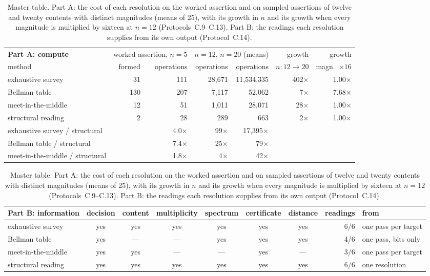 \documentclass[pdflatex,sn-mathphys-num]{sn-jnl}
\theoremstyle{thmstyleone}%
\theoremstyle{thmstyletwo}%
\theoremstyle{thmstylethree}%
\begin{document}
\begin{table}[!htbp]
\centering\footnotesize
\caption{Master table. Part A: the cost of each resolution on the worked assertion and on sampled assertions of twelve and twenty contents with distinct magnitudes (means of 25), with its growth in $n$ and its growth when every magnitude is multiplied by sixteen at $n=12$ (Protocols~C.9--C.13). Part B: the readings each resolution supplies from its own output (Protocol~C.14).}
\label{tab:master}
\setlength{\tabcolsep}{4pt}
\begin{tabular}{lrrrrrr}
\toprule
\textbf{Part A: compute} & \multicolumn{2}{c}{worked assertion, $n=5$} & \multicolumn{2}{c}{$n=12$, $n=20$ (means)} & growth & growth \\
method & formed & operations & operations & operations & $n{:}12\to20$ & magn.\ $\times16$ \\
\midrule
exhaustive survey & 31 & 111 & 28,671 & 11,534,335 & 402$\times$ & 1.00$\times$ \\
Bellman table & 130 & 207 & 7,117 & 52,062 & 7$\times$ & 7.68$\times$ \\
meet-in-the-middle & 12 & 51 & 1,011 & 28,071 & 28$\times$ & 1.00$\times$ \\
structural reading & 2 & 28 & 289 & 663 & 2$\times$ & 1.00$\times$ \\
\midrule
\quad exhaustive survey / structural & & 4.0$\times$ & 99$\times$ & 17,395$\times$ & & \\
\quad Bellman table / structural & & 7.4$\times$ & 25$\times$ & 79$\times$ & & \\
\quad meet-in-the-middle / structural & & 1.8$\times$ & 4$\times$ & 42$\times$ & & \\
\bottomrule
\end{tabular}\par\vspace{0.8em}
\begin{tabular}{lccccccrl}
\toprule
\textbf{Part B: information} & decision & content & multiplicity & spectrum & certificate & distance & readings & from \\
\midrule
exhaustive survey & yes & yes & yes & yes & yes & yes & 6/6 & one pass per target \\
Bellman table & yes & --- & --- & yes & yes & yes & 4/6 & one pass, bits only \\
meet-in-the-middle & yes & yes & --- & --- & yes & --- & 3/6 & one pass per target \\
structural reading & yes & yes & yes & yes & yes & yes & 6/6 & one resolution \\
\bottomrule
\end{tabular}
\end{table}
\end{document}
